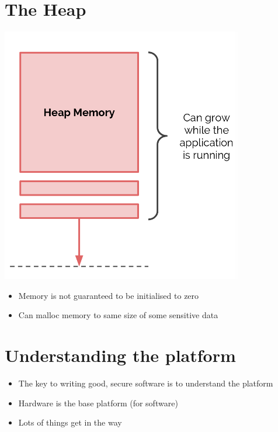 \documentclass{article}[18pt]
\begin{document}
\section{The Heap}
\begin{center}
	\includegraphics[scale=0.7]{heap}
\end{center}
\begin{itemize}
	\item Memory is not guaranteed to be initialised to zero
	\item Can malloc memory to same size of some sensitive data
\end{itemize}
\section{Understanding the platform}
\begin{itemize}
	\item The key to writing good, secure software is to understand the platform
	\item Hardware is the base platform (for software)
	\item Lots of things get in the way
\end{itemize}
\end{document}
